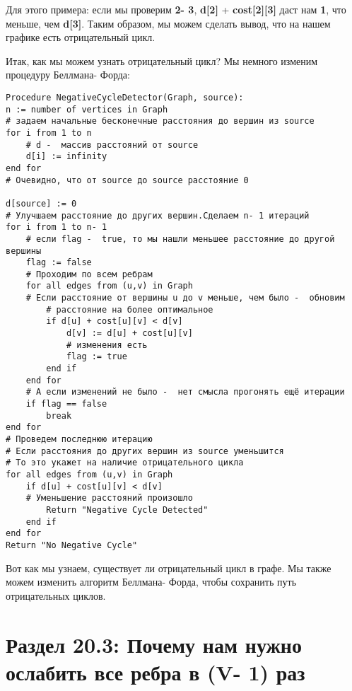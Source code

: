 \vspace{\baselineskip}

Для этого примера: если мы проверим \textbf{2- 3}, \textbf{d[2]} + \textbf{cost[2][3]} даст нам \textbf{1}, что меньше, чем \textbf{d[3]}. Таким образом, мы можем сделать вывод, что на нашем графике есть отрицательный цикл.

\vspace{\baselineskip}

Итак, как мы можем узнать отрицательный цикл? Мы немного изменим процедуру Беллмана- Форда:

\begin{tcolorbox}
\begin{verbatim}
Procedure NegativeCycleDetector(Graph, source):
n := number of vertices in Graph
# задаем начальные бесконечные расстояния до вершин из source
for i from 1 to n
    # d -  массив расстояний от source
    d[i] := infinity
end for
# Очевидно, что от source до source расстояние 0

d[source] := 0
# Улучшаем расстояние до других вершин.Сделаем n- 1 итераций
for i from 1 to n- 1
    # если flag -  true, то мы нашли меньшее расстояние до другой вершины
    flag := false
    # Проходим по всем ребрам
    for all edges from (u,v) in Graph
    # Если расстояние от вершины u до v меньше, чем было -  обновим
        # расстояние на более оптимальное
        if d[u] + cost[u][v] < d[v]
            d[v] := d[u] + cost[u][v]
            # изменения есть
            flag := true
        end if
    end for
    # А если изменений не было -  нет смысла прогонять ещё итерации
    if flag == false
        break
end for
# Проведем последнюю итерацию
# Если расстояния до других вершин из source уменьшится
# То это укажет на наличие отрицательного цикла
for all edges from (u,v) in Graph
    if d[u] + cost[u][v] < d[v]
    # Уменьшение расстояний произошло
        Return "Negative Cycle Detected"
    end if
end for
Return "No Negative Cycle"
\end{verbatim}
\end{tcolorbox}

Вот как мы узнаем, существует ли отрицательный цикл в графе. Мы также можем изменить алгоритм Беллмана- Форда, чтобы сохранить путь отрицательных циклов.

\section*{Раздел 20.3: Почему нам нужно ослабить все ребра в (V- 1) раз}

